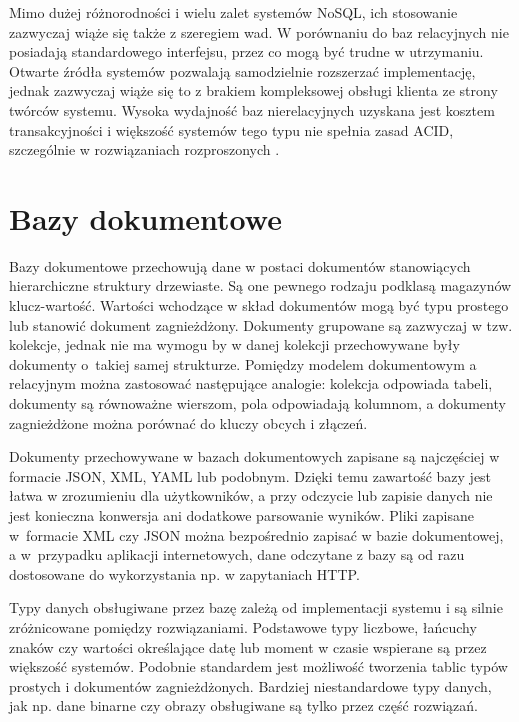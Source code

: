 \documentclass[a4paper,twoside,12pt]{book}
\begin{document}
Mimo dużej różnorodności i wielu zalet systemów NoSQL, ich stosowanie zazwyczaj wiąże się także z szeregiem wad. W porównaniu do baz relacyjnych nie posiadają standardowego interfejsu, przez co mogą być trudne w utrzymaniu. Otwarte źródła systemów pozwalają samodzielnie rozszerzać implementację, jednak zazwyczaj wiąże się to z brakiem kompleksowej obsługi klienta ze strony twórców systemu. Wysoka wydajność baz nierelacyjnych uzyskana jest kosztem transakcyjności i większość systemów tego typu nie spełnia zasad ACID, szczególnie w rozwiązaniach rozproszonych \cite{bib:a-survey-and-comparison-of-relational-and-non-relational-database}. 

\section{Bazy dokumentowe}

Bazy dokumentowe przechowują dane w postaci dokumentów stanowiących hierarchiczne struktury drzewiaste. Są one pewnego rodzaju podklasą magazynów klucz-wartość. Wartości wchodzące w skład dokumentów mogą być typu prostego lub stanowić dokument zagnieżdżony. Dokumenty grupowane są zazwyczaj w tzw. kolekcje, jednak nie ma wymogu by w danej kolekcji przechowywane były dokumenty o~takiej samej strukturze. Pomiędzy modelem dokumentowym a relacyjnym można zastosować następujące analogie: kolekcja odpowiada tabeli, dokumenty są równoważne wierszom, pola odpowiadają kolumnom, a dokumenty zagnieżdżone można porównać do kluczy obcych i złączeń.

Dokumenty przechowywane w bazach dokumentowych zapisane są najczęściej w formacie JSON, XML, YAML lub podobnym. Dzięki temu zawartość bazy jest łatwa w zrozumieniu dla użytkowników, a przy odczycie lub zapisie danych nie jest konieczna konwersja ani dodatkowe parsowanie wyników. Pliki zapisane w~formacie XML czy JSON można bezpośrednio zapisać w bazie dokumentowej, a w~przypadku aplikacji internetowych, dane odczytane z bazy są od razu dostosowane do wykorzystania np. w zapytaniach HTTP. 

Typy danych obsługiwane przez bazę zależą od implementacji systemu i są silnie zróżnicowane pomiędzy rozwiązaniami. Podstawowe typy liczbowe, łańcuchy znaków czy wartości określające datę lub moment w czasie wspierane są przez większość systemów. Podobnie standardem jest możliwość tworzenia tablic typów prostych i dokumentów zagnieżdżonych. Bardziej niestandardowe typy danych, jak np. dane binarne czy obrazy obsługiwane są tylko przez część rozwiązań.
\end{document}
